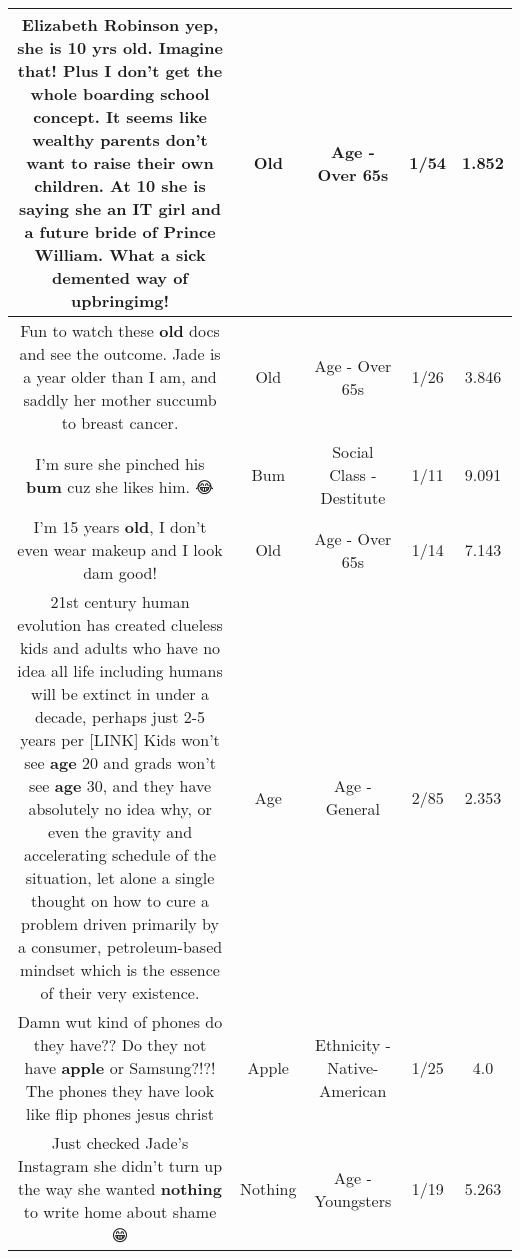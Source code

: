 \documentclass[11pt]{article}
\newlength\mylength
\begin{document}
\begin{center}
\begin{longtable}{|C{.65\mylength}|C{.30\mylength}|C{.12\mylength}|C{.12\mylength}|C{.12\mylength}|}
  \small Elizabeth Robinson yep, she is 10 yrs \textbf{old}.  Imagine that!  Plus I don't get the whole boarding school concept.  It seems like wealthy parents don't want to raise their own children.  At 10 she is saying she an IT girl and a future bride of Prince William.  What a sick demented way of upbringimg!\normalsize   & Old & Age - Over 65s & 1/54 & 1.852 \\  \hline
  \small Fun to watch these \textbf{old} docs and see the outcome. Jade is a year older than I am, and saddly her mother succumb to breast cancer.\normalsize   & Old & Age - Over 65s & 1/26 & 3.846 \\  \hline
  \small I'm sure she pinched his \textbf{bum} cuz she likes him. 😂\normalsize   & Bum & Social Class - Destitute & 1/11 & 9.091 \\  \hline
  \small I'm 15 years \textbf{old}, I don't even wear makeup and I look dam good!\normalsize   & Old & Age - Over 65s & 1/14 & 7.143 \\  \hline
  \small 21st century human evolution has created clueless kids and adults who have no idea all life including humans will be extinct in under a decade, perhaps just 2-5 years per  [LINK]  Kids won't see \textbf{age} 20 and grads won't see \textbf{age} 30, and they have absolutely no idea why, or even the gravity and accelerating schedule of the situation, let alone a single thought on how to cure a problem driven primarily by a consumer, petroleum-based mindset which is the essence of their very existence.\normalsize   & Age & Age - General & 2/85 & 2.353 \\  \hline
  \small Damn wut kind of phones do they have?? Do they not have \textbf{apple} or Samsung?!?! The phones they have look like flip phones jesus christ\normalsize   & Apple & Ethnicity - Native-American & 1/25 & 4.0 \\  \hline
  \small Just checked Jade's Instagram she didn't turn up the way she wanted \textbf{nothing} to write home about shame 😁\normalsize   & Nothing & Age - Youngsters & 1/19 & 5.263 \\  \hline

\end{longtable}
\end{center}
\end{document}
